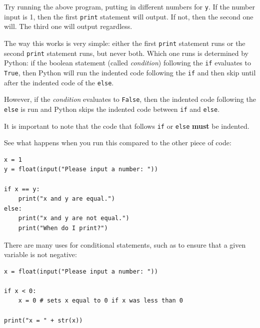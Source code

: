 \documentclass[11pt,hidelinks]{article}
\begin{document}
Try running the above program, putting in different numbers for \lstinline{y}.
If the number input is 1, then the first \lstinline!print! statement will
output. If not, then the second one will. The third one will output regardless.

The way this works is very simple: either the first \lstinline!print! statement
runs or the second \lstinline!print! statement runs, but never both. Which one
runs is determined by Python: if the boolean statement (called \emph{condition})
following the \lstinline!if! evaluates to \lstinline!True!, then Python will
run the indented code following the \lstinline!if! and then skip until after
the indented code of the \lstinline!else!.

However, if the \emph{condition} evaluates to \lstinline!False!, then the
indented code following the \lstinline!else! is run and Python skips the
indented code between \lstinline!if! and \lstinline!else!.

It is important to note that the code that follows \lstinline!if! or
\lstinline!else! \textbf{must} be indented.

See what happens when you run this compared to the other piece of code:
\begin{lstlisting}
x = 1
y = float(input("Please input a number: "))

if x == y:
    print("x and y are equal.")
else:
    print("x and y are not equal.")
    print("When do I print?")
\end{lstlisting}


There are many uses for conditional statements, such as to ensure that a given
variable is not negative:

\begin{lstlisting}[style=python]
x = float(input("Please input a number: "))

if x < 0:
    x = 0 # sets x equal to 0 if x was less than 0

print("x = " + str(x))
\end{lstlisting}
\end{document}
